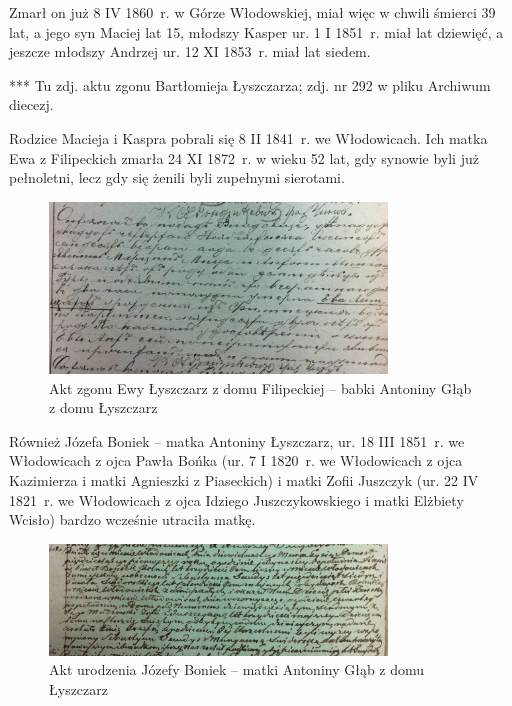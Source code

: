Zmarł on już 8 IV 1860~r. w Górze Włodowskiej, miał więc w chwili śmierci 39 lat, a jego syn Maciej lat 15, młodszy Kasper ur. 1 I 1851~r. miał lat dziewięć, a jeszcze młodszy Andrzej ur. 12 XI 1853~r. miał lat siedem.

{\color{red}
*** Tu zdj. aktu zgonu Bartłomieja Łyszczarza; zdj. nr 292 w pliku Archiwum diecezj.}

Rodzice Macieja i Kaspra pobrali się 8 II 1841~r. we Włodowicach. Ich matka Ewa z Filipeckich zmarła 24 XI 1872~r. w wieku 52 lat, gdy synowie byli już pełnoletni, lecz gdy się żenili byli zupełnymi sierotami.

\begin{figure}[!h]
\begin{center}
\includegraphics[width=0.8\textwidth]{zdjecia/akt_zgonu_ewy_lyszczarz.jpg}
\caption[Akt zgonu Ewy Łyszczarz z domu Filipeckiej]{Akt zgonu Ewy Łyszczarz z domu Filipeckiej -- babki Antoniny Głąb z domu Łyszczarz}
\label{rys:akt_zgonu_ewy_lyszczarz}
\end{center}
\end{figure}

Również Józefa Boniek -- matka Antoniny Łyszczarz, ur. 18 III 1851~r. we Włodowicach z ojca Pawła Bońka (ur. 7 I 1820~r. we Włodowicach z ojca Kazimierza i matki Agnieszki z Piaseckich) i matki Zofii Juszczyk (ur. 22 IV 1821~r. we Włodowicach z ojca Idziego Juszczykowskiego i matki Elżbiety Wcisło) bardzo wcześnie utraciła matkę.

\begin{figure}[!h]
\begin{center}
\includegraphics[width=0.8\textwidth]{zdjecia/akt_urodzenia_jozefy_boniek.jpg}
\caption[Akt urodzenia Józefy Boniek]{Akt urodzenia Józefy Boniek -- matki Antoniny Głąb z domu Łyszczarz}
\label{rys:akt_urodzenia_jozefy_boniek}
\end{center}
\end{figure}

